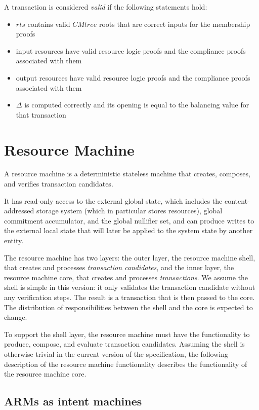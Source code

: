 A transaction is considered \textit{valid} if the following statements hold:
\begin{itemize}
    \item $rts$ contains valid $CMtree$ roots that are correct inputs for the membership proofs
    \item input resources have valid resource logic proofs and the compliance proofs associated with them
    \item output resources have valid resource logic proofs and the compliance proofs associated with them
    \item $\Delta$ is computed correctly and its opening is equal to the balancing value for that transaction
\end{itemize}

\section{Resource Machine}

A resource machine is a deterministic stateless machine that creates, composes, and verifies transaction candidates. 

It has read-only access to the external global state, which includes the content-addressed storage system (which in particular stores resources), global commitment accumulator, and the global nullifier set, and can produce writes to the external local state that will later be applied to the system state by another entity.

The resource machine has two layers: the outer layer, the resource machine shell, that creates and processes \textit{transaction candidates}, and the inner layer, the resource machine core, that creates and processes \textit{transactions}. We assume the shell is simple in this version: it only validates the transaction candidate without any verification steps. The result is a transaction that is then passed to the core. The distribution of responsibilities between the shell and the core is expected to change.

To support the shell layer, the resource machine must have the functionality to produce, compose, and evaluate transaction candidates. Assuming the shell is otherwise trivial in the current version of the specification, the following description of the resource machine functionality describes the functionality of the resource machine core.

\subsection{ARMs as intent machines}

